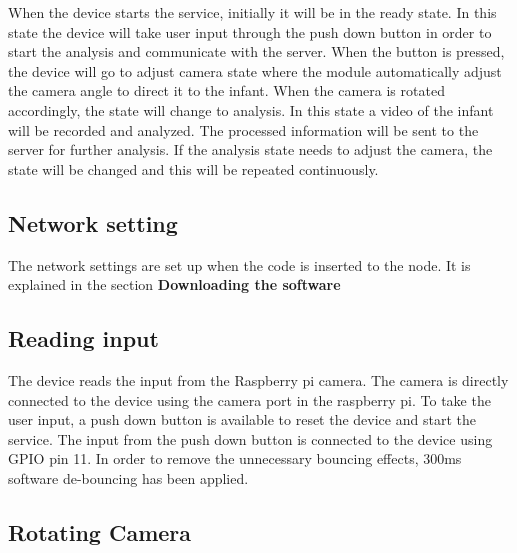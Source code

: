 \documentclass{report}
\begin{document}
When the device starts the service, initially it will be in the ready state. In this state the device will take user input through the push down button in order to start the analysis and communicate with the server. When the button is pressed, the device will go to adjust camera state where the module automatically adjust the camera angle to direct it to the infant. When the camera is rotated accordingly, the state will change to analysis. In this state a video of the infant will be recorded and analyzed. The processed information will be sent to the server for further analysis. If the analysis state needs to adjust the camera, the state will be changed and this will be repeated continuously. 

\subsection{Network setting}
The network settings are set up when the code is inserted to the node. It is explained in the section \textbf{Downloading the software}


\subsection{Reading input}
The device reads the input from the Raspberry pi camera. The camera is directly connected to the device using the camera port in the raspberry pi. To take the user input, a push down button is available to reset the device and start the service. The input from the push down button is connected to the device using GPIO pin 11. In order to remove the unnecessary bouncing effects, 300ms software de-bouncing has been applied.

\subsection{Rotating Camera}
\end{document}
